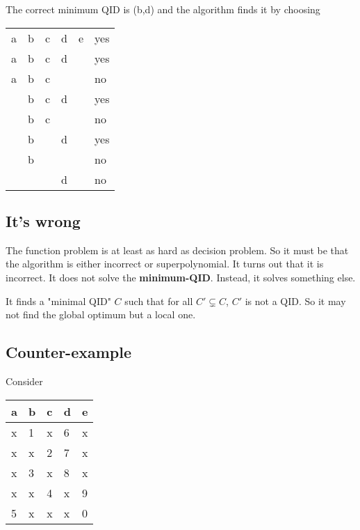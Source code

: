 \documentclass[12pt]{article}
\begin{document}
The correct minimum QID is (b,d) and the algorithm finds it by choosing
\begin{center}
    \begin{tabular}{ | M{3em} | M{3em} | M{3em} | M{3em} | M{3em} | M{3em} | }
    \hline
    a & b & c & d & e & yes\\
    a & b & c & d &   & yes\\
    a & b & c &   &   & no\\
      & b & c & d &   & yes\\
      & b & c &   &   & no\\
      & b &   & d &   & yes\\
      & b &   &   &   & no\\
      &   &   & d &   & no\\
    \hline
    \end{tabular}
\end{center}

\subsection*{It's wrong}
The function problem is at least as hard as decision problem. So it must be that the algorithm is either incorrect or superpolynomial. It turns out that it is incorrect. It does not solve the \textbf{minimum-QID}. Instead, it solves something else.

It finds a "minimal QID" $C$ such that for all $C' \subsetneq C$, $C'$ is not a QID. So it may not find the global optimum but a local one.

\newpage
\subsection*{Counter-example}
Consider
\begin{center}
    \begin{tabular}{ | M{3em} | M{3em} | M{3em} | M{3em} | M{3em} | }
    \hline
    a & b & c & d & e\\
    \hline
    x & 1 & x & 6 & x\\
    x & x & 2 & 7 & x\\
    x & 3 & x & 8 & x\\
    x & x & 4 & x & 9\\
    5 & x & x & x & 0\\
    \hline
    \end{tabular}
\end{center}
\end{document}
